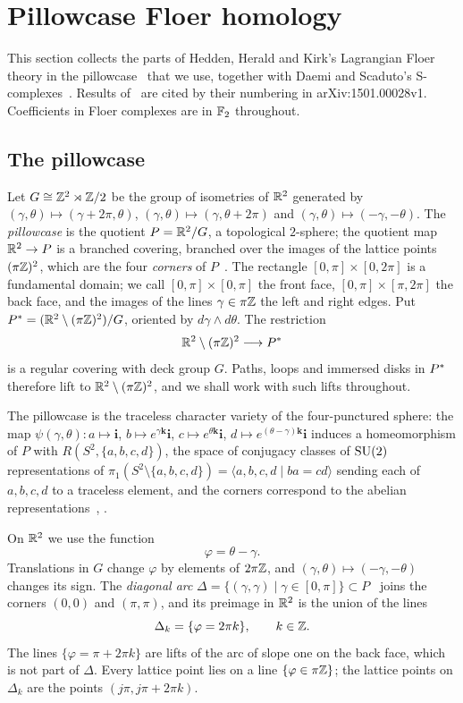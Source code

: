 \section{Pillowcase Floer homology}\label{sec:hhk}

This section collects the parts of Hedden, Herald and Kirk's Lagrangian Floer theory in the
pillowcase~\cite{HHK2} that we use, together with Daemi and Scaduto's S-complexes~\cite{DSEquiv}.
Results of~\cite{HHK2} are cited by their numbering in arXiv:1501.00028v1. Coefficients in Floer
complexes are in $\mathbb{F}_2$ throughout.

\subsection{The pillowcase}\label{ss:pillowcase}
Let $G\cong\mathbb{Z}^2\rtimes\mathbb{Z}/2$ be the group of isometries of $\mathbb{R}^2$ generated by
$(\gamma,\theta)\mapsto(\gamma+2\pi,\theta)$, $(\gamma,\theta)\mapsto(\gamma,\theta+2\pi)$ and
$(\gamma,\theta)\mapsto(-\gamma,-\theta)$. The \emph{pillowcase} is the quotient $P=\mathbb{R}^2/G$, a
topological $2$-sphere; the quotient map $\mathbb{R}^2\to P$ is a branched covering, branched over the images of
the lattice points $(\pi\mathbb{Z})^2$, which are the four \emph{corners} of $P$~\cite[\S3.1]{HHK2}. The rectangle
$[0,\pi]\times[0,2\pi]$ is a fundamental domain; we call $[0,\pi]\times[0,\pi]$ the front face,
$[0,\pi]\times[\pi,2\pi]$ the back face, and the images of the lines $\gamma\in\pi\mathbb{Z}$ the left and right
edges. Put $P^{*}=(\mathbb{R}^2\setminus(\pi\mathbb{Z})^2)/G$, oriented by $d\gamma\wedge d\theta$. The restriction
\[
\mathbb{R}^2\setminus(\pi\mathbb{Z})^2\longrightarrow P^{*}
\]
is a regular covering with deck group $G$. Paths, loops and immersed disks in $P^{*}$ therefore lift to
$\mathbb{R}^2\setminus(\pi\mathbb{Z})^2$, and we shall work with such lifts throughout.

The pillowcase is the traceless character variety of the four-punctured sphere: the map
$\psi(\gamma,\theta)\colon a\mapsto\mathbf i$, $b\mapsto e^{\gamma\mathbf k}\mathbf i$, $c\mapsto e^{\theta\mathbf
k}\mathbf i$, $d\mapsto e^{(\theta-\gamma)\mathbf k}\mathbf i$ induces a homeomorphism of $P$ with
$R(S^2,\{a,b,c,d\})$, the space of conjugacy classes of $\mathrm{SU}(2)$ representations of
$\pi_1(S^2\setminus\{a,b,c,d\})=\langle a,b,c,d\mid ba=cd\rangle$ sending each of $a,b,c,d$ to a traceless
element, and the corners correspond to the abelian representations~\cite[Prop.~6.1]{HHK2},
\cite[Prop.~3.1]{HHK1}.

On $\mathbb{R}^2$ we use the function
\[
\varphi=\theta-\gamma .
\]
Translations in $G$ change $\varphi$ by elements of $2\pi\mathbb{Z}$, and $(\gamma,\theta)\mapsto(-\gamma,-\theta)$ changes
its sign. The \emph{diagonal arc} $\Delta=\{(\gamma,\gamma)\mid\gamma\in[0,\pi]\}\subset P$~\cite[(12)]{HHK2}
joins the corners $(0,0)$ and $(\pi,\pi)$, and its preimage in $\mathbb{R}^2$ is the union of the lines
\[
\Delta_k=\{\varphi=2\pi k\},\qquad k\in\mathbb{Z} .
\]
The lines $\{\varphi=\pi+2\pi k\}$ are lifts of the arc of slope one on the back face, which is not part of
$\Delta$. Every lattice point lies on a line $\{\varphi\in\pi\mathbb{Z}\}$; the lattice points on $\Delta_k$ are the
points $(j\pi,j\pi+2\pi k)$.

